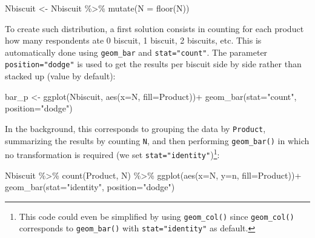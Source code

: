 \documentclass[
]{book}
\newenvironment{Shaded}{\begin{snugshade}}{\end{snugshade}}
\newcommand{\AttributeTok}[1]{\textcolor[rgb]{0.77,0.63,0.00}{#1}}
\newcommand{\FunctionTok}[1]{\textcolor[rgb]{0.00,0.00,0.00}{#1}}
\newcommand{\NormalTok}[1]{#1}
\newcommand{\OtherTok}[1]{\textcolor[rgb]{0.56,0.35,0.01}{#1}}
\newcommand{\SpecialCharTok}[1]{\textcolor[rgb]{0.00,0.00,0.00}{#1}}
\newcommand{\StringTok}[1]{\textcolor[rgb]{0.31,0.60,0.02}{#1}}
\begin{document}
\begin{Shaded}
\begin{Highlighting}[]
\NormalTok{Nbiscuit }\OtherTok{\textless{}{-}}\NormalTok{ Nbiscuit }\SpecialCharTok{\%\textgreater{}\%} 
  \FunctionTok{mutate}\NormalTok{(}\AttributeTok{N =} \FunctionTok{floor}\NormalTok{(N))}
\end{Highlighting}
\end{Shaded}

To create such distribution, a first solution consists in counting for each product how many respondents ate 0 biscuit, 1 biscuit, 2 biscuits, etc. This is automatically done using \texttt{geom\_bar} and \texttt{stat="count"}. The parameter \texttt{position="dodge"} is used to get the results per biscuit side by side rather than stacked up (value by default):

\begin{Shaded}
\begin{Highlighting}[]
\NormalTok{bar\_p }\OtherTok{\textless{}{-}} \FunctionTok{ggplot}\NormalTok{(Nbiscuit, }\FunctionTok{aes}\NormalTok{(}\AttributeTok{x=}\NormalTok{N, }\AttributeTok{fill=}\NormalTok{Product))}\SpecialCharTok{+}
  \FunctionTok{geom\_bar}\NormalTok{(}\AttributeTok{stat=}\StringTok{"count"}\NormalTok{, }\AttributeTok{position=}\StringTok{"dodge"}\NormalTok{)}
\end{Highlighting}
\end{Shaded}

In the background, this corresponds to grouping the data by \texttt{Product}, summarizing the results by counting \texttt{N}, and then performing \texttt{geom\_bar()} in which no transformation is required (we set \texttt{stat="identity"})\footnote{This code could even be simplified by using \texttt{geom\_col()} since \texttt{geom\_col()} corresponds to \texttt{geom\_bar()} with \texttt{stat="identity"} as default.}:

\begin{Shaded}
\begin{Highlighting}[]
\NormalTok{Nbiscuit }\SpecialCharTok{\%\textgreater{}\%} 
  \FunctionTok{count}\NormalTok{(Product, N) }\SpecialCharTok{\%\textgreater{}\%} 
  \FunctionTok{ggplot}\NormalTok{(}\FunctionTok{aes}\NormalTok{(}\AttributeTok{x=}\NormalTok{N, }\AttributeTok{y=}\NormalTok{n, }\AttributeTok{fill=}\NormalTok{Product))}\SpecialCharTok{+}
  \FunctionTok{geom\_bar}\NormalTok{(}\AttributeTok{stat=}\StringTok{"identity"}\NormalTok{, }\AttributeTok{position=}\StringTok{"dodge"}\NormalTok{)}
\end{Highlighting}
\end{Shaded}
\end{document}
